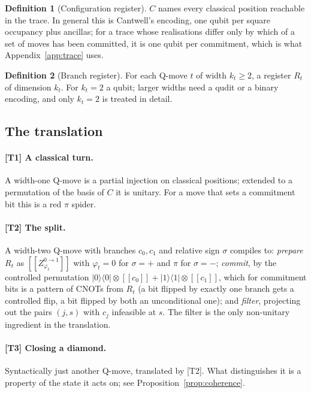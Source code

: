 \documentclass[11pt,a4paper]{article}
\theoremstyle{definition}
\newtheorem{definition}{Definition}[section]
\theoremstyle{plain}
\newcommand{\lbr}{[\![}
\newcommand{\rbr}{]\!]}
\newcommand{\gr}[1]{\lbr #1 \rbr}
\begin{document}
\begin{definition}[Configuration register]
$C$ names every classical position reachable in the trace. In general this is
Cantwell's encoding, one qubit per square occupancy plus ancillas; for a trace
whose realisations differ only by which of a set of moves has been committed, it
is one qubit per commitment, which is what Appendix~\ref{app:trace} uses.
\end{definition}

\begin{definition}[Branch register]
For each Q-move $t$ of width $k_t\ge 2$, a register $R_t$ of dimension $k_t$.
For $k_t=2$ a qubit; larger widths need a qudit or a binary encoding, and only
$k_t=2$ is treated in detail.
\end{definition}

\subsection{The translation}

\paragraph{[T1] A classical turn.}
A width-one Q-move is a partial injection on classical positions; extended to a
permutation of the basis of $C$ it is unitary. For a move that sets a commitment
bit this is a red $\pi$ spider.

\paragraph{[T2] The split.}
A width-two Q-move with branches $c_0,c_1$ and relative sign $\sigma$ compiles
to: \emph{prepare} $R_t$ as $\gr{Z^{0\to1}_{\varphi_t}}$ with $\varphi_t = 0$
for $\sigma = +$ and $\pi$ for $\sigma = -$; \emph{commit}, by the controlled
permutation $|0\rangle\langle 0|\otimes\gr{c_0} + |1\rangle\langle
1|\otimes\gr{c_1}$, which for commitment bits is a pattern of CNOTs from $R_t$
(a bit flipped by exactly one branch gets a controlled flip, a bit flipped by
both an unconditional one); and \emph{filter}, projecting out the pairs $(j,s)$
with $c_j$ infeasible at $s$. The filter is the only non-unitary ingredient in
the translation.

\paragraph{[T3] Closing a diamond.}
Syntactically just another Q-move, translated by [T2]. What distinguishes it is
a property of the state it acts on; see Proposition~\ref{prop:coherence}.
\end{document}
